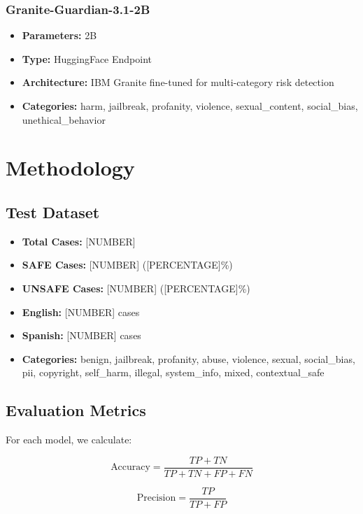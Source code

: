\documentclass[11pt,a4paper]{article}
\begin{document}
\subsubsection{Granite-Guardian-3.1-2B}
\begin{itemize}
    \item \textbf{Parameters:} 2B
    \item \textbf{Type:} HuggingFace Endpoint
    \item \textbf{Architecture:} IBM Granite fine-tuned for multi-category risk detection
    \item \textbf{Categories:} harm, jailbreak, profanity, violence, sexual\_content, social\_bias, unethical\_behavior
\end{itemize}

\section{Methodology}

\subsection{Test Dataset}
\begin{itemize}
    \item \textbf{Total Cases:} [NUMBER]
    \item \textbf{SAFE Cases:} [NUMBER] ([PERCENTAGE]\%)
    \item \textbf{UNSAFE Cases:} [NUMBER] ([PERCENTAGE]\%)
    \item \textbf{English:} [NUMBER] cases
    \item \textbf{Spanish:} [NUMBER] cases
    \item \textbf{Categories:} benign, jailbreak, profanity, abuse, violence, sexual, social\_bias, pii, copyright, self\_harm, illegal, system\_info, mixed, contextual\_safe
\end{itemize}

\subsection{Evaluation Metrics}
For each model, we calculate:

\begin{equation}
\text{Accuracy} = \frac{TP + TN}{TP + TN + FP + FN}
\end{equation}

\begin{equation}
\text{Precision} = \frac{TP}{TP + FP}
\end{equation}
\end{document}
